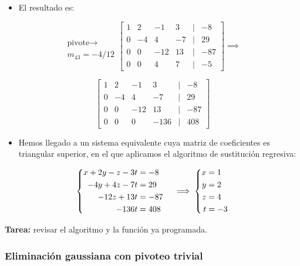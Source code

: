 \documentclass[openany]{book}
\providecommand{\tightlist}{%
  \setlength{\itemsep}{0pt}\setlength{\parskip}{0pt}}
\begin{document}
\begin{itemize}
\tightlist
\item
  El resultado es:
\end{itemize}

\[
\begin{matrix}
\\ \\ \text{pivote} \rightarrow \\ m_{43} = -4/12
\end{matrix}
\begin{bmatrix}
1 & 2 & -1 & 3 &|& -8\\
0 & -4 & 4 & -7 &|& 29\\
0 & 0 & -12 & 13 &|& -87\\
0 & 0 & 4 & 7 &|& -5  
\end{bmatrix}
\implies
\]

\[
\begin{bmatrix}
1 & 2 & -1 & 3 &|& -8\\
0 & -4 & 4 & -7 &|& 29\\
0 & 0 & -12 & 13 &|& -87\\
0 & 0 & 0 & -136 &|& 408  
\end{bmatrix}
\]

\begin{itemize}
\tightlist
\item
  Hemos llegado a un sistema equivalente cuya matriz de coeficientes es triangular superior, en el que aplicamos el algoritmo de sustitución regresiva:
\end{itemize}

\[
\left\{
\begin{aligned}
x+2y-z-3t &=-8 \cr
-4y+4z-7t &=29\cr
-12z+13t &=-87\cr
-136t &=408
\end{aligned}
\right.
\implies
\left\{
\begin{aligned}
x &= 1\\ y &= 2\\ z &= 4\\ t &= -3
\end{aligned}
\right.
\]

\textbf{Tarea:} revisar el algoritmo y la función ya programada.

\hypertarget{eliminaciuxf3n-gaussiana-con-pivoteo-trivial}{%
\subsubsection*{Eliminación gaussiana con pivoteo trivial}\label{eliminaciuxf3n-gaussiana-con-pivoteo-trivial}}
\end{document}
